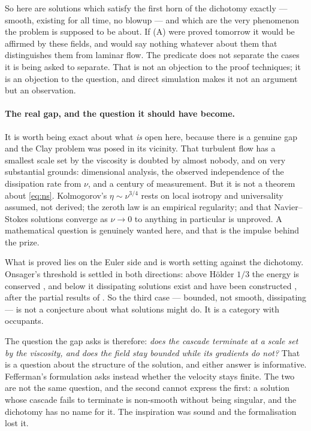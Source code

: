 \documentclass[11pt]{article}
\begin{document}
So here are solutions which satisfy the first horn of the dichotomy exactly --- smooth, existing for
all time, no blowup --- and which are the very phenomenon the problem is supposed to be about. If
(A) were proved tomorrow it would be affirmed by these fields, and would say nothing whatever about
them that distinguishes them from laminar flow. The predicate does not separate the cases it is
being asked to separate. That is not an objection to the proof techniques; it is an objection to the
question, and direct simulation makes it not an argument but an observation.

\paragraph{The real gap, and the question it should have become.} It is worth being exact about
what \emph{is} open here, because there is a genuine gap and the Clay problem was posed in its
vicinity. That turbulent flow has a smallest scale set by the viscosity is doubted by almost nobody,
and on very substantial grounds: dimensional analysis, the observed independence of the dissipation
rate from $\nu$, and a century of measurement. But it is not a theorem about \eqref{eq:ns}.
Kolmogorov's $\eta\sim\nu^{3/4}$ rests on local isotropy and universality assumed, not derived; the
zeroth law is an empirical regularity; and that Navier--Stokes solutions converge as $\nu\to0$ to
anything in particular is unproved. A mathematical question is genuinely wanted here, and that is
the impulse behind the prize.

What is proved lies on the Euler side and is worth setting against the dichotomy. Onsager's
threshold is settled in both directions: above H\"older $1/3$ the energy is conserved
\cite{cet}, and below it dissipating solutions exist and have been constructed \cite{isett}, after
the partial results of \cite{eyink,dls,bdlis}. So the
third case --- bounded, not smooth, dissipating --- is not a conjecture about what solutions might
do. It is a category with occupants.

The question the gap asks is therefore: \emph{does the cascade terminate at a scale set by the
viscosity, and does the field stay bounded while its gradients do not?} That is a question about the
structure of the solution, and either answer is informative. Fefferman's formulation asks instead
whether the velocity stays finite. The two are not the same question, and the second cannot express
the first: a solution whose cascade fails to terminate is non-smooth without being singular, and the
dichotomy has no name for it. The inspiration was sound and the formalisation lost it.
\end{document}
